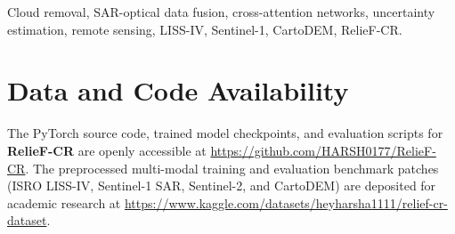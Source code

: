 \documentclass[journal,twocolumn]{IEEEtran}
\begin{document}
\begin{IEEEkeywords}
Cloud removal, SAR-optical data fusion, cross-attention networks, uncertainty estimation, remote sensing, LISS-IV, Sentinel-1, CartoDEM, RelieF-CR.
\end{IEEEkeywords}

\IEEEpeerreviewmaketitle










\section*{Data and Code Availability}
The PyTorch source code, trained model checkpoints, and evaluation scripts for \textbf{RelieF-CR} are openly accessible at \url{https://github.com/HARSH0177/RelieF-CR}. The preprocessed multi-modal training and evaluation benchmark patches (ISRO LISS-IV, Sentinel-1 SAR, Sentinel-2, and CartoDEM) are deposited for academic research at \url{https://www.kaggle.com/datasets/heyharsha1111/relief-cr-dataset}.


\begingroup
\let\oldbibliography\thebibliography
\renewcommand{\thebibliography}[1]{%
  \oldbibliography{#1}%
  \setlength{\itemsep}{1.5pt}%
  \setlength{\parskip}{0pt}%
}

\endgroup
\end{document}
